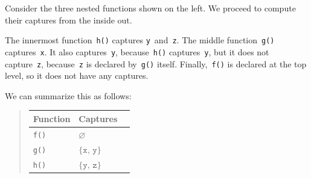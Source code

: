\documentclass[../generics]{subfiles}
\begin{document}
Consider the three nested functions shown on the left. We proceed to compute their captures from the inside out.

The innermost function~\texttt{h()} captures \texttt{y}~and~\texttt{z}. The middle function~\texttt{g()} captures~\texttt{x}. It also captures~\texttt{y}, because~\texttt{h()} captures~\texttt{y}, but it does not capture~\texttt{z}, because~\texttt{z} is declared by~\texttt{g()} itself. Finally,~\texttt{f()} is declared at the top level, so it does not have any captures.

We can summarize this as follows:
\begin{quote}
\qquad\qquad
\begin{tabular}{lll}
\toprule
\textbf{Function}&\textbf{Captures}\\
\midrule
\texttt{f()}&$\varnothing$\\
\texttt{g()}&$\{\texttt{x},\,\texttt{y}\}$\\
\texttt{h()}&$\{\texttt{y},\,\texttt{z}\}$\\
\bottomrule
\end{tabular}
\end{quote}

\bigskip
\end{document}

